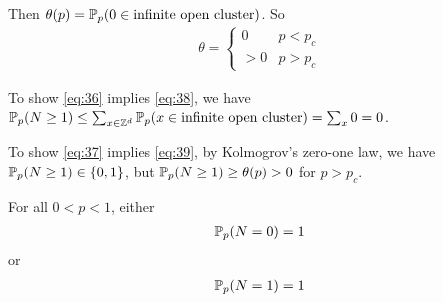Then $\theta(p) = \Prob_{p}(0 \in \text{infinite open cluster})$. So
\begin{align}
  \label{eq:35}
  \theta =
  \begin{cases}
    \label{eq:36}
    0 & p  < p_{c} \\
    \label{eq:37}
    > 0 & p > p_{c}
  \end{cases}
\end{align}

To show \eqref{eq:36} implies \eqref{eq:38}, we have $\Prob_{p}(N \geq
1) \leq \sum_{x \in \Z^{d}}\Prob_{p}(x \in \text{infinite open
  cluster}) = \sum_{x} 0 = 0$.

To show \eqref{eq:37} implies \eqref{eq:39}, by Kolmogrov's zero-one law, we have $\Prob_{p}(N \geq 1) \in \{ 0, 1
\}$, but $\Prob_{p}(N \geq 1) \geq \theta(p) > 0$ for $p > p_{c}$.

\begin{thm}
  \label{defn:random_walks_on_graphs:19}
  For all $0 < p < 1$, either
  \begin{align}
    \label{eq:41}
    \Prob_{p}(N = 0) = 1
  \end{align} or
  \begin{align}
    \label{eq:42}
    \Prob_{p}(N = 1) = 1
  \end{align}
\end{thm}


